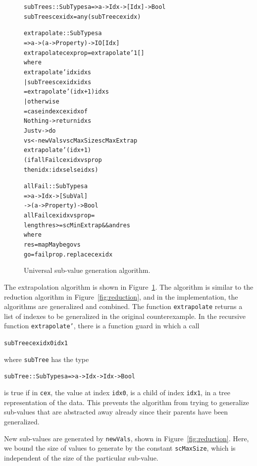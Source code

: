 \documentclass[10pt]{sigplanconf}
\newenvironment{code}{\begin{alltt}\small}{\end{alltt}}
\newcommand{\ttp}[1]{\texttt{#1}}
\begin{document}
\begin{figure}
  \begin{code}
subTrees :: SubTypes a => a -> Idx -> [Idx] -> Bool
subTrees cex idx = any (subTree cex idx)

extrapolate :: SubTypes a
            => a -> (a -> Property) -> IO [Idx]
extrapolate cex prop = extrapolate' 1 []
  where
  extrapolate' idx idxs
    | subTrees cex idx idxs
    = extrapolate' (idx+1) idxs
    | otherwise
    = case index cex idx of
        Nothing -> return idxs
        Just v  -> do
          vs <- newVals v scMaxSize scMaxExtrap
          extrapolate' (idx+1)
            (if allFail cex idx vs prop
               then idx:idxs else idxs)

allFail :: SubTypes a
        => a -> Idx -> [SubVal]
        -> (a -> Property) -> Bool
allFail cex idx vs prop =
  length res >= scMinExtrap && and res
  where
  res  = mapMaybe go vs
  go   = fail prop . replace cex idx
  \end{code}
  \caption{Universal sub-value generation algorithm.}
  \label{fig:universal}
\end{figure}

The extrapolation algorithm is shown in Figure~\ref{fig:universal}.  The
algorithm is similar to the reduction algorithm in Figure~\ref{fig:reduction},
and in the implementation, the algorithms are generalized and combined.  The
function \ttp{extrapolate} returns a list of indexes to be generalized in the
original counterexample.  In the recursive function \ttp{extrapolate'}, there is
a function guard in which a call
%
\begin{code}
subTree cex idx0 idx1
\end{code}
%
\noindent
where \ttp{subTree} has the type
%
\begin{code}
subTree :: SubTypes a => a -> Idx -> Idx -> Bool
\end{code}
%
\noindent
is true if in \ttp{cex}, the value at index \ttp{idx0}, is a child of index
\ttp{idx1}, in a tree representation of the data.  This prevents the algorithm
from trying to generalize sub-values that are abstracted away already since
their parents have been generalized.

New sub-values are generated by \ttp{newVals}, shown in
Figure~\ref{fig:reduction}.  Here, we bound the size of values to generate by
the constant \ttp{scMaxSize}, which is independent of the size of the particular
sub-value.
\end{document}

